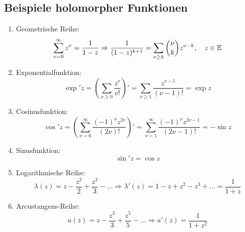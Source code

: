 \subsection*{Beispiele holomorpher Funktionen}
\begin{enumerate}
	\item Geometrische Reihe:
	\[ \sum_{\nu=0}^\infty z^\nu=\frac{1}{1-z}\Rightarrow\frac{1}{(1-z)^{k+1}}=\sum_{\nu\geq k}^{}\binom{\nu}{k}z^{\nu-k},\quad z\in\mathbb{E}  \]
	\item Exponentialfunktion:
	\[ \exp' z=\left(\sum_{\nu\geq 0}^{}\frac{z^\nu}{\nu!}\right)'=\sum_{\nu\geq 1}^{}\frac{z^{\nu-1}}{(\nu-1)!}=\exp z \]
	\item Cosinusfunktion:
	\[ \cos' z=\left(\sum_{\nu=0}^{\infty}\frac{(-1)^\nu z^{2\nu}}{(2\nu)!}\right)'=\sum_{\nu=1}^{\infty}\frac{(-1)^\nu z^{2\nu-1}}{(2\nu-1)!}=-\sin z \]
	\item Sinusfunktion:
	\[ \sin' z=\cos z \]
	\item Logarithmische Reihe:
	\[ \lambda(z)=z-\frac{z^2}{2}+\frac{z^3}{3}-...\Rightarrow\lambda'(z)=1-z+z^2-z^3+...=\frac{1}{1+z} \]
	\item Arcustangens-Reihe:
	\[ a(z)=z-\frac{z^3}{3}+\frac{z^5}{5}-...\Rightarrow a'(z)=\frac{1}{1+z^2} \]
\end{enumerate}
